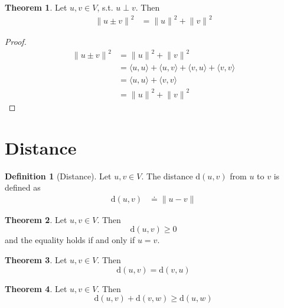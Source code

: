 \documentclass[fleqn, a4paper, 12pt]{article}
\theoremstyle{definition}
\newtheorem{definition}{Definition} %
\theoremstyle{theorem}
\newtheorem{theorem}{Theorem} %
\theoremstyle{remark}
\newcommand{\distance}{\mathrm{d}}
\numberwithin{corollary}{theorem}
\numberwithin{equation}{theorem}
\begin{document}
\begin{theorem}
	Let $u, v \in V$, s.t. $u \perp v$. Then
	\begin{align*}
		{\| u \pm v \|}^2 &= {\| u \|}^2 + {\| v \|}^2
	\end{align*}
\end{theorem}

\begin{proof}
	\begin{align*}
		{\| u \pm v \|}^2 &= {\| u \|}^2 + {\| v \|}^2\\
		&= \langle u, u \rangle + \langle u, v \rangle + \langle v, u \rangle + \langle v, v \rangle\\
		&= \langle u, u \rangle + \langle v, v \rangle\\
		&= {\| u \|}^2 + {\| v \|}^2
	\end{align*}
\end{proof}

\section{Distance}

\begin{definition}[Distance]
	Let $u, v \in V$. The distance $\distance(u, v)$ from $u$ to $v$ is defined as
	\begin{align*}
		\distance(u, v) &\doteq \| u - v \|
	\end{align*}
\end{definition}

\begin{theorem}
	Let $u, v \in V$. Then
	\begin{equation*}
		\distance(u,v) \geq 0
	\end{equation*}
	and the equality holds if and only if $u = v$.
\end{theorem}

\begin{theorem}
	Let $u, v \in V$. Then
	\begin{equation*}
		\distance(u,v) = \distance(v,u)
	\end{equation*}
\end{theorem}

\begin{theorem}
	Let $u, v \in V$. Then
	\begin{equation*}
		\distance(u,v) + \distance(v,w) \geq \distance(u,w)
	\end{equation*}
\end{theorem}
\end{document}
